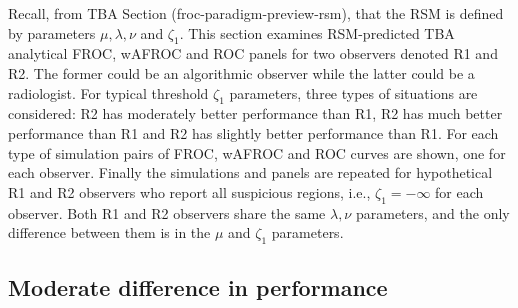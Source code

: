 \documentclass[
]{book}
\begin{document}
Recall, from TBA Section (froc-paradigm-preview-rsm), that the RSM is defined by parameters \(\mu, \lambda, \nu\) and \(\zeta_1\). This section examines RSM-predicted TBA analytical FROC, wAFROC and ROC panels for two observers denoted R1 and R2. The former could be an algorithmic observer while the latter could be a radiologist. For typical threshold \(\zeta_1\) parameters, three types of situations are considered: R2 has moderately better performance than R1, R2 has much better performance than R1 and R2 has slightly better performance than R1. For each type of simulation pairs of FROC, wAFROC and ROC curves are shown, one for each observer. Finally the simulations and panels are repeated for hypothetical R1 and R2 observers who report all suspicious regions, i.e., \(\zeta_1 = -\infty\) for each observer. Both R1 and R2 observers share the same \(\lambda, \nu\) parameters, and the only difference between them is in the \(\mu\) and \(\zeta_1\) parameters.

\hypertarget{moderate-difference-in-performance}{%
\subsection{Moderate difference in performance}\label{moderate-difference-in-performance}}
\end{document}
